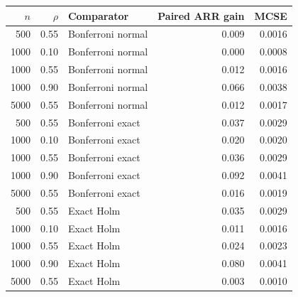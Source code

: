 \begin{tabular}{rrlrr}
\toprule
$n$ & $\rho$ & Comparator & Paired ARR gain & MCSE \\
\midrule
500 & 0.55 & Bonferroni normal & 0.009 & 0.0016 \\
1000 & 0.10 & Bonferroni normal & 0.000 & 0.0008 \\
1000 & 0.55 & Bonferroni normal & 0.012 & 0.0016 \\
1000 & 0.90 & Bonferroni normal & 0.066 & 0.0038 \\
5000 & 0.55 & Bonferroni normal & 0.012 & 0.0017 \\
500 & 0.55 & Bonferroni exact & 0.037 & 0.0029 \\
1000 & 0.10 & Bonferroni exact & 0.020 & 0.0020 \\
1000 & 0.55 & Bonferroni exact & 0.036 & 0.0029 \\
1000 & 0.90 & Bonferroni exact & 0.092 & 0.0041 \\
5000 & 0.55 & Bonferroni exact & 0.016 & 0.0019 \\
500 & 0.55 & Exact Holm & 0.035 & 0.0029 \\
1000 & 0.10 & Exact Holm & 0.011 & 0.0016 \\
1000 & 0.55 & Exact Holm & 0.024 & 0.0023 \\
1000 & 0.90 & Exact Holm & 0.080 & 0.0041 \\
5000 & 0.55 & Exact Holm & 0.003 & 0.0010 \\
\bottomrule
\end{tabular}
